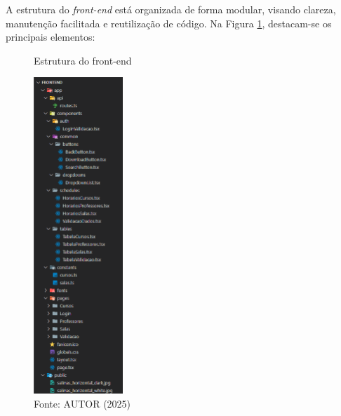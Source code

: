 A estrutura do \textit{front-end} está organizada de forma modular, visando clareza, manutenção facilitada e reutilização de código. Na Figura \ref{fig_front_14}, destacam-se os principais elementos:

\begin{figure}[htb]
    \centering
    \caption{Estrutura do front-end}
    \includegraphics[width=0.3\textwidth]{Figuras/front-14.png}
    \caption*{Fonte: AUTOR (2025)}
    \label{fig_front_14}
\end{figure}

